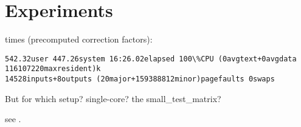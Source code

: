 \chapter{Experiments}\label{chap:experiments}

% 
% 


times (precomputed correction factors):
\begin{verbatim}
542.32user 447.26system 16:26.02elapsed 100\%CPU (0avgtext+0avgdata 116107220maxresident)k
14528inputs+8outputs (20major+159388812minor)pagefaults 0swaps
\end{verbatim}

But for which setup? single-core? the small\_test\_matrix?






see .
